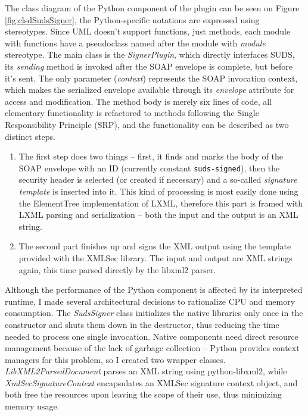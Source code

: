 The class diagram of the Python component of the plugin can be seen on Figure \ref{fig:clsdSudsSigner}, the Python-specific notations are expressed using stereotypes. Since UML doesn't support functions, just methods, each module with functions have a pseudoclass named after the module with \emph{module} stereotype. The main class is the \emph{SignerPlugin}, which directly interfaces SUDS, its \emph{sending} method is invoked after the SOAP envelope is complete, but before it's sent. The only parameter (\emph{context}) represents the SOAP invocation context, which makes the serialized envelope available through its \emph{envelope} attribute for access and modification. The method body is merely six lines of code, all elementary functionality is refactored to methods following the Single Responsibility Principle (SRP), and the functionality can be described as two distinct steps.

\begin{enumerate}
 \item The first step does two things -- first, it finds and marks the body of the SOAP envelope with an ID (currently constant \verb|suds-signed|), then the security header is selected (or created if necessary) and a so-called \emph{signature template} is inserted into it. This kind of processing is most easily done using the ElementTree implementation of LXML, therefore this part is framed with LXML parsing and serialization -- both the input and the output is an XML string.
 \item The second part finishes up and signs the XML output using the template provided with the XMLSec library. The input and output are XML strings again, this time parsed directly by the libxml2 parser.
\end{enumerate}

Although the performance of the Python component is affected by its interpreted runtime, I made several architectural decisions to rationalize CPU and memory consumption. The \emph{SudsSigner} class initializes the native libraries only once in the constructor and shuts them down in the destructor, thus reducing the time needed to process one single invocation. Native components need direct resource management because of the lack of garbage collection -- Python provides context managers for this problem, so I created two wrapper classes. \emph{LibXML2ParsedDocument} parses an XML string using python-libxml2, while \emph{XmlSecSignatureContext} encapsulates an XMLSec signature context object, and both free the resources upon leaving the scope of their use, thus minimizing memory usage.

